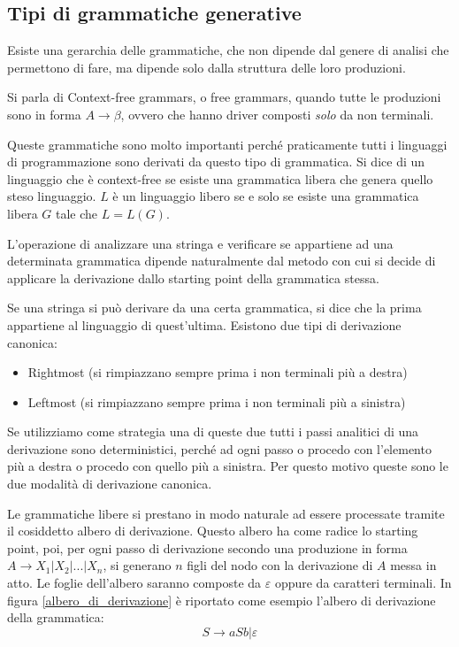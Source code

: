 \documentclass[class=book, crop=false, oneside]{standalone}
\begin{document}
\subsection{Tipi di grammatiche generative}
Esiste una gerarchia delle grammatiche, che non dipende dal genere di analisi che permettono di fare, ma dipende solo dalla struttura delle loro produzioni.

Si parla di Context-free grammars, o free grammars, quando tutte le produzioni sono in forma $A \to \beta$, ovvero che hanno driver composti \emph{solo} da non terminali.

Queste grammatiche sono molto importanti perché praticamente tutti i linguaggi di programmazione sono derivati da questo tipo di grammatica.
Si dice di un linguaggio che è context-free se esiste una grammatica libera che genera quello steso linguaggio.
$L$ è un linguaggio libero se e solo se esiste una grammatica libera $G$ tale che $L=L(G)$.

L’operazione di analizzare una stringa e verificare se appartiene ad una determinata grammatica dipende naturalmente dal metodo con cui si decide di applicare la derivazione dallo starting point della grammatica stessa.

Se una stringa si può derivare da una certa grammatica, si dice che la prima appartiene al linguaggio di quest'ultima.
Esistono due tipi di derivazione canonica:
\begin{itemize}
    \item Rightmost (si rimpiazzano sempre prima i non terminali più a destra)
    \item Leftmost (si rimpiazzano sempre prima i non terminali più a sinistra)
\end{itemize}
Se utilizziamo come strategia una di queste due tutti i passi analitici di una derivazione sono deterministici, perché ad ogni passo o procedo con l’elemento più a destra o procedo con quello più a sinistra. Per questo motivo queste sono le due modalità di derivazione canonica.

Le grammatiche libere si prestano in modo naturale ad essere processate tramite il cosiddetto albero di derivazione.
Questo albero ha come radice lo starting point, poi, per ogni passo di derivazione secondo una produzione in forma $A \to X_1 | X_2 |...| X_n $, si generano $n$ figli del nodo con la derivazione di $A$ messa in atto.
Le foglie dell’albero saranno composte da $\varepsilon$ oppure da caratteri terminali. In figura \ref{albero_di_derivazione} è riportato come esempio l'albero di derivazione della grammatica:
\begin{equation}
    S \to aSb | \varepsilon
    \label{grammatica_allbero}
\end{equation}
\end{document}
